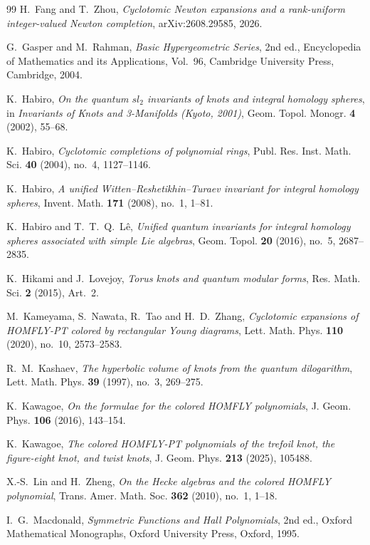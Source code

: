 \documentclass[11pt]{amsart}
\begin{document}
\begin{thebibliography}{99}
H.~Fang and T.~Zhou,
\emph{Cyclotomic Newton expansions and a rank-uniform integer-valued
Newton completion},
arXiv:2608.29585, 2026.

G.~Gasper and M.~Rahman,
\emph{Basic Hypergeometric Series},
2nd ed., Encyclopedia of Mathematics and its Applications, Vol.~96,
Cambridge University Press, Cambridge, 2004.

K.~Habiro,
\emph{On the quantum $sl_2$ invariants of knots and integral homology
spheres},
in \emph{Invariants of Knots and 3-Manifolds (Kyoto, 2001)},
Geom. Topol. Monogr. \textbf{4} (2002), 55--68.

K.~Habiro,
\emph{Cyclotomic completions of polynomial rings},
Publ. Res. Inst. Math. Sci. \textbf{40} (2004), no.~4, 1127--1146.

K.~Habiro,
\emph{A unified Witten--Reshetikhin--Turaev invariant for integral
homology spheres},
Invent. Math. \textbf{171} (2008), no.~1, 1--81.

K.~Habiro and T.~T.~Q.~L{\^e},
\emph{Unified quantum invariants for integral homology spheres
associated with simple Lie algebras},
Geom. Topol. \textbf{20} (2016), no.~5, 2687--2835.

K.~Hikami and J.~Lovejoy,
\emph{Torus knots and quantum modular forms},
Res. Math. Sci. \textbf{2} (2015), Art.~2.

M.~Kameyama, S.~Nawata, R.~Tao and H.~D.~Zhang,
\emph{Cyclotomic expansions of HOMFLY-PT colored by rectangular Young
diagrams},
Lett. Math. Phys. \textbf{110} (2020), no.~10, 2573--2583.

R.~M.~Kashaev,
\emph{The hyperbolic volume of knots from the quantum dilogarithm},
Lett. Math. Phys. \textbf{39} (1997), no.~3, 269--275.

K.~Kawagoe,
\emph{On the formulae for the colored HOMFLY polynomials},
J. Geom. Phys. \textbf{106} (2016), 143--154.

K.~Kawagoe,
\emph{The colored HOMFLY-PT polynomials of the trefoil knot, the
figure-eight knot, and twist knots},
J. Geom. Phys. \textbf{213} (2025), 105488.

X.-S.~Lin and H.~Zheng,
\emph{On the Hecke algebras and the colored HOMFLY polynomial},
Trans. Amer. Math. Soc. \textbf{362} (2010), no.~1, 1--18.

I.~G.~Macdonald,
\emph{Symmetric Functions and Hall Polynomials},
2nd ed., Oxford Mathematical Monographs,
Oxford University Press, Oxford, 1995.


\end{thebibliography}
\end{document}
